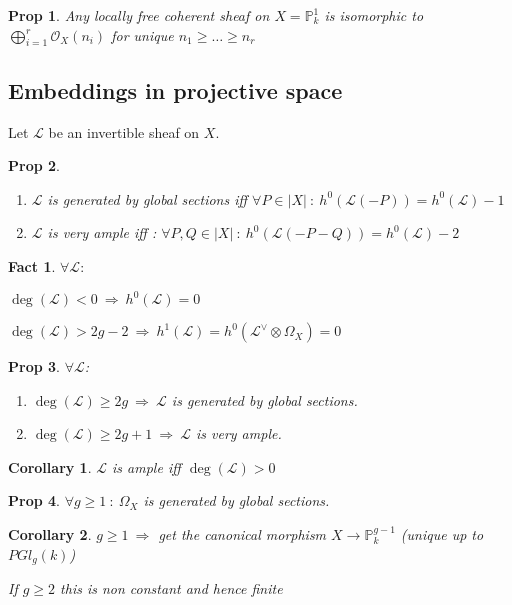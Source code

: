 \documentclass[a4paper, 12pt]{article}
\newcommand{\cl}{\mathcal{L}}
\newcommand{\ox}{\mathcal{O}_X}
\newcommand{\bbp}{\mathbb{P}}
\newtheorem*{prop}{Prop}
\newtheorem*{fact}{Fact}
\newtheorem*{cor}{Corollary}
\begin{document}
	\begin{prop}
		Any locally free coherent sheaf on $ X = \bbp^1_k $ is isomorphic to $ \bigoplus_{i=1}^r \ox(n_i)  $ for unique $ n_1 \ge \dots \ge n_r $
	\end{prop}
	
	\subsection{Embeddings in projective space}
	
	Let $ \cl $ be an invertible sheaf on $ X $.
	
	\begin{prop}
		\begin{enumerate}
			\item $ \cl $ is generated by global sections iff $ \forall P \in |X| \: : \: h^0(\cl(-P)) = h^0(\cl) - 1 $
			\item $ \cl $ is very ample iff : $ \forall P,Q \in |X| \: : \: h^0(\cl(-P-Q)) = h^0(\cl) -2 $
		\end{enumerate}
	\end{prop}
	
	\begin{fact}
		$ \forall \cl : $
		
		$ \deg(\cl) < 0 \: \Rightarrow \: h^0(\cl) =0 $
		
		$ \deg (\cl) > 2g -2 \: \Rightarrow \: h^1(\cl) = h^0(\cl^{\vee} \otimes \Omega_X) = 0 $
	\end{fact}
	
	\begin{prop}
		$ \forall \cl $:
		\begin{enumerate}
			\item $ \deg (\cl) \ge 2g \: \Rightarrow \: \cl $ is generated by global sections.
			\item $ \deg (\cl) \ge 2g + 1 \: \Rightarrow \: \cl $ is very ample.
		\end{enumerate}
	\end{prop}
	
	\begin{cor}
		$ \cl $ is ample iff $ \deg (\cl) >0 $
	\end{cor}
	
	\begin{prop}
		$ \forall g \ge 1 \: : \: \Omega_X $ is generated by global sections.
	\end{prop}
	
	\begin{cor}
		$ g \ge 1 \: \Rightarrow  $ get the canonical morphism $ X \rightarrow \bbp^{g-1}_k $ (unique up to $ PGl_g(k) $)
		
		If $ g \ge 2 $ this is non constant and hence finite
	\end{cor}
	
\end{document}
